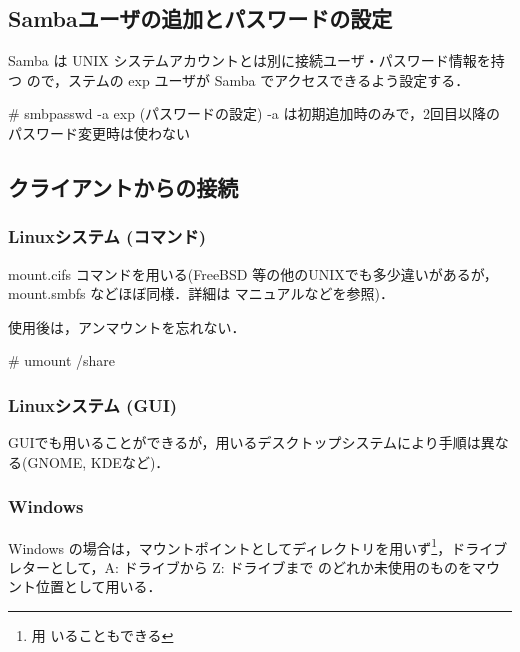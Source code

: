 \subsection*{Sambaユーザの追加とパスワードの設定}
Samba は UNIX システムアカウントとは別に接続ユーザ・パスワード情報を持つ
ので，ステムの exp ユーザが Samba でアクセスできるよう設定する．

\begin{cli}
# smbpasswd -a exp
(パスワードの設定)
-a は初期追加時のみで，2回目以降のパスワード変更時は使わない
\end{cli}

\subsection*{クライアントからの接続}

\subsubsection*{Linuxシステム (コマンド)}

mount.cifs コマンドを用いる(FreeBSD 等の他のUNIXでも多少違いがあるが，
mount.smbfs などほぼ同様．詳細は マニュアルなどを参照)．


使用後は，アンマウントを忘れない．

\begin{cli}
# umount /share
\end{cli}

\subsubsection*{Linuxシステム (GUI)}

GUIでも用いることができるが，用いるデスクトップシステムにより手順は異な
る(GNOME, KDEなど)．

\subsubsection*{Windows}

Windows の場合は，マウントポイントとしてディレクトリを用いず\footnote{用
いることもできる}，ドライブレターとして，A: ドライブから Z: ドライブまで
のどれか未使用のものをマウント位置として用いる．

